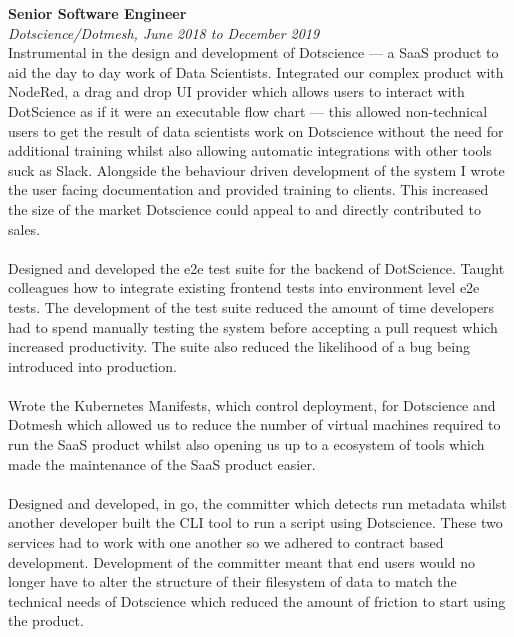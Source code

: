 \documentclass{article}
\begin{document}
\begin{flushleft}
\textbf{Senior Software Engineer}\\
\textit{Dotscience/Dotmesh, June 2018 to December 2019}\\[5pt]
Instrumental in the design and development of Dotscience — a SaaS product to aid the day to day work of Data Scientists. Integrated our complex product with NodeRed, a drag and drop UI provider which allows users to interact with DotScience as if it were an executable flow chart — this allowed non-technical users to get the result of data scientists work on Dotscience without the need for additional training whilst also allowing automatic integrations with other tools suck as Slack. Alongside the behaviour driven development of the system I wrote the user facing documentation and provided training to clients. This increased the size of the market Dotscience could appeal to and directly contributed to sales.

\paragraph{}Designed and developed the e2e test suite for the backend of DotScience. Taught colleagues how to integrate existing frontend tests into environment level e2e tests. The development of the test suite reduced the amount of time developers had to spend manually testing the system before accepting a pull request which increased productivity. The suite also reduced the likelihood of a bug being introduced into production. 

\paragraph{}Wrote the Kubernetes Manifests, which control deployment, for Dotscience and Dotmesh which allowed us to reduce the number of virtual machines required to run the SaaS product whilst also opening us up to a ecosystem of tools which made the maintenance of the SaaS product easier.

\paragraph{}Designed and developed, in go, the committer which detects run metadata whilst another developer built the CLI tool to run a script using Dotscience. These two services had to work with one another so we adhered to contract based development. Development of the committer meant that end users would no longer have to alter the structure of their filesystem of data to match the technical needs of Dotscience which reduced the amount of friction to start using the product.\\[10pt]


\end{flushleft}
\end{document}
